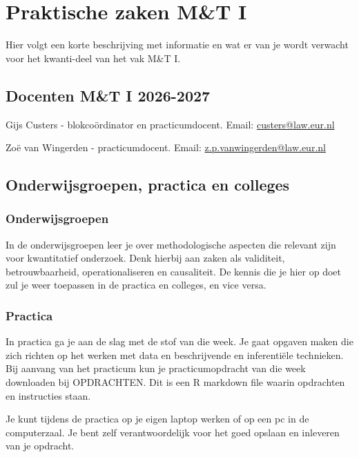 \documentclass[
  letterpaper,
  DIV=11,
  numbers=noendperiod]{scrreprt}
\begin{document}
\chapter{Praktische zaken M\&T I}\label{praktische-zaken-mt-i}

Hier volgt een korte beschrijving met informatie en wat er van je wordt
verwacht voor het kwanti-deel van het vak M\&T I.

\section{Docenten M\&T I 2026-2027}\label{docenten-mt-i-2026-2027}

Gijs Custers - blokcoördinator en practicumdocent. Email:
\ul{custers@law.eur.nl}

Zoë van Wingerden - practicumdocent. Email:
\ul{z.p.vanwingerden@law.eur.nl}

\section{Onderwijsgroepen, practica en
colleges}\label{onderwijsgroepen-practica-en-colleges}

\subsection{Onderwijsgroepen}\label{onderwijsgroepen}

In de onderwijsgroepen leer je over methodologische aspecten die
relevant zijn voor kwantitatief onderzoek. Denk hierbij aan zaken als
validiteit, betrouwbaarheid, operationaliseren en causaliteit. De kennis
die je hier op doet zul je weer toepassen in de practica en colleges, en
vice versa.

\subsection{Practica}\label{practica}

In practica ga je aan de slag met de stof van die week. Je gaat opgaven
maken die zich richten op het werken met data en beschrijvende en
inferentiële technieken. Bij aanvang van het practicum kun je
practicumopdracht van die week downloaden bij OPDRACHTEN. Dit is een R
markdown file waarin opdrachten en instructies staan.

Je kunt tijdens de practica op je eigen laptop werken of op een pc in de
computerzaal. Je bent zelf verantwoordelijk voor het goed opslaan en
inleveren van je opdracht.
\end{document}
